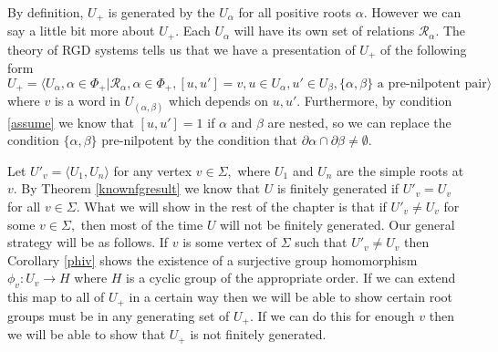 \documentclass[class=book, crop=false,12 pt]{standalone}
\begin{document}
By definition, $U_+$ is generated by the $U_\alpha$ for all positive roots $\alpha.$ However we can say a little bit more about $U_+.$ Each $U_\alpha$ will have its own set of relations $\mathcal{R}_\alpha.$ The theory of RGD systems tells us that we have a presentation of $U_+$ of the following form
\[
	U_+=\langle U_\alpha,\alpha\in \Phi_+|\mathcal{R}_\alpha,\alpha\in \Phi_+,[u,u']=v,u\in U_\alpha,u'\in U_\beta,\{\alpha,\beta\} \text{ a pre-nilpotent pair}\rangle
\]
where $v$ is a word in $U_{(\alpha,\beta)}$ which depends on $u,u'.$ Furthermore, by condition \eqref{assume} we know that $[u,u']=1$ if $\alpha$ and $\beta$ are nested, so we can replace the condition $\{\alpha,\beta\}$ pre-nilpotent by the condition that $\partial\alpha\cap \partial \beta\neq \emptyset.$ 

Let $U'_v=\langle U_1,U_n\rangle$ for any vertex $v\in \Sigma,$ where $U_1$ and $U_n$ are the simple roots at $v.$ By Theorem \ref{knownfgresult} we know that $U$ is finitely generated if $U'_v=U_v$ for all $v\in \Sigma.$ What we will show in the rest of the chapter is that if $U'_v\neq U_v$ for some $v\in \Sigma,$ then most of the time $U$ will not be finitely generated. Our general strategy will be as follows. If $v$ is some vertex of $\Sigma$ such that $U'_v\neq U_v$ then Corollary \ref{phiv} shows the existence of a surjective group homomorphism $\phi_v:U_v\to H$ where $H$ is a cyclic group of the appropriate order. If we can extend this map to all of $U_+$ in a certain way then we will be able to show certain root groups must be in any generating set of $U_+.$ If we can do this for enough $v$ then we will be able to show that $U_+$ is not finitely generated.
\end{document}
